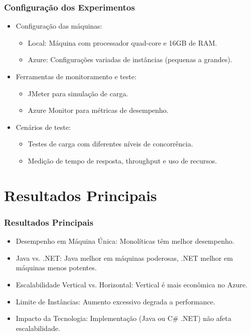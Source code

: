 \documentclass{beamer}
\begin{document}
\begin{frame}
\frametitle{Configuração dos Experimentos}
\begin{itemize}
    \item Configuração das máquinas:
    \begin{itemize}
        \item Local: Máquina com processador quad-core e 16GB de RAM.
        \item Azure: Configurações variadas de instâncias (pequenas a grandes).
    \end{itemize}
    \item Ferramentas de monitoramento e teste:
    \begin{itemize}
        \item JMeter para simulação de carga.
        \item Azure Monitor para métricas de desempenho.
    \end{itemize}
    \item Cenários de teste:
    \begin{itemize}
        \item Testes de carga com diferentes níveis de concorrência.
        \item Medição de tempo de resposta, throughput e uso de recursos.
    \end{itemize}
\end{itemize}
\end{frame}

\section{Resultados Principais}

\begin{frame}
\frametitle{Resultados Principais}
\begin{itemize}
    \item Desempenho em Máquina Única: Monolíticas têm melhor desempenho.
    \item Java vs. .NET: Java melhor em máquinas poderosas, .NET melhor em máquinas menos potentes.
    \item Escalabilidade Vertical vs. Horizontal: Vertical é mais econômica no Azure.
    \item Limite de Instâncias: Aumento excessivo degrada a performance.
    \item Impacto da Tecnologia: Implementação (Java ou C\# .NET) não afeta escalabilidade.
\end{itemize}
\end{frame}
\end{document}

